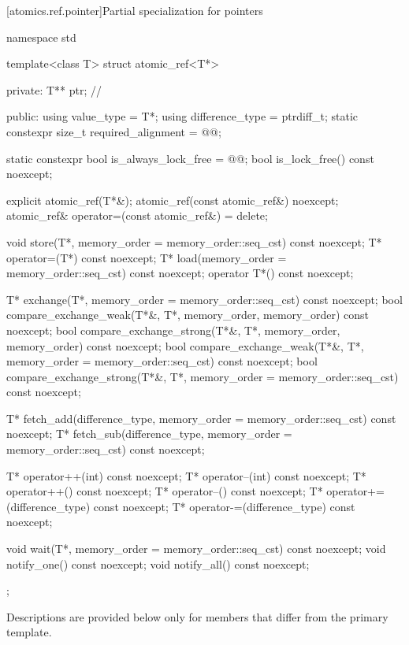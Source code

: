 [atomics.ref.pointer]{Partial specialization for pointers}
%

\begin{codeblock}
namespace std {
  template<class T> struct atomic_ref<T*> {
  private:
    T** ptr;        // \expos

  public:
    using value_type = T*;
    using difference_type = ptrdiff_t;
    static constexpr size_t required_alignment = @@;

    static constexpr bool is_always_lock_free = @@;
    bool is_lock_free() const noexcept;

    explicit atomic_ref(T*&);
    atomic_ref(const atomic_ref&) noexcept;
    atomic_ref& operator=(const atomic_ref&) = delete;

    void store(T*, memory_order = memory_order::seq_cst) const noexcept;
    T* operator=(T*) const noexcept;
    T* load(memory_order = memory_order::seq_cst) const noexcept;
    operator T*() const noexcept;

    T* exchange(T*, memory_order = memory_order::seq_cst) const noexcept;
    bool compare_exchange_weak(T*&, T*,
                               memory_order, memory_order) const noexcept;
    bool compare_exchange_strong(T*&, T*,
                                 memory_order, memory_order) const noexcept;
    bool compare_exchange_weak(T*&, T*,
                               memory_order = memory_order::seq_cst) const noexcept;
    bool compare_exchange_strong(T*&, T*,
                                 memory_order = memory_order::seq_cst) const noexcept;

    T* fetch_add(difference_type, memory_order = memory_order::seq_cst) const noexcept;
    T* fetch_sub(difference_type, memory_order = memory_order::seq_cst) const noexcept;

    T* operator++(int) const noexcept;
    T* operator--(int) const noexcept;
    T* operator++() const noexcept;
    T* operator--() const noexcept;
    T* operator+=(difference_type) const noexcept;
    T* operator-=(difference_type) const noexcept;

    void wait(T*, memory_order = memory_order::seq_cst) const noexcept;
    void notify_one() const noexcept;
    void notify_all() const noexcept;
  };
}
\end{codeblock}

\pnum
Descriptions are provided below only for members
that differ from the primary template.


